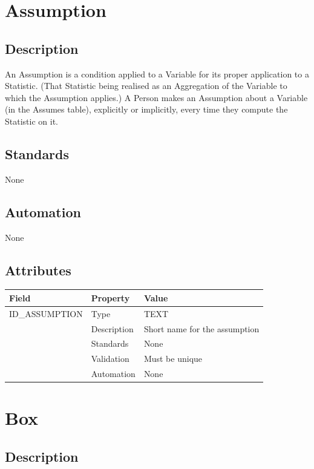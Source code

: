 \section{Assumption}\label{assumption}

\subsection{Description}\label{description-3}

An Assumption is a condition applied to a Variable for its proper
application to a Statistic. (That Statistic being realised as an
Aggregation of the Variable to which the Assumption applies.) A Person
makes an Assumption about a Variable (in the Assumes table), explicitly
or implicitly, every time they compute the Statistic on it.

\subsection{Standards}\label{standards-5}

None

\subsection{Automation}\label{automation-5}

None

\subsection{Attributes}\label{attributes-5}

\begin{longtable}[]{@{}lll@{}}
\toprule\noalign{}
Field & Property & Value \\
\midrule\noalign{}
\endhead
\bottomrule\noalign{}
\endlastfoot
ID\_ASSUMPTION & Type & TEXT \\
& Description & Short name for the assumption \\
& Standards & None \\
& Validation & Must be unique \\
& Automation & None \\
\end{longtable}

\section{Box}\label{box}

\subsection{Description}\label{description-4}

